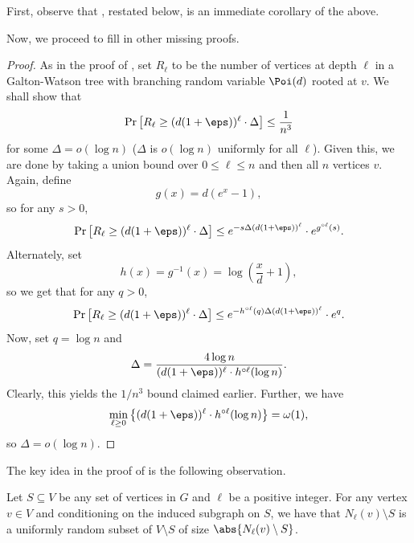 \documentclass[11pt,letterpaper]{article}
\begin{document}
First, observe that , restated below, is an immediate corollary of the above.
\radiusbound*

Now, we proceed to fill in other missing proofs.
\logloglog*

\begin{proof}
    As in the proof of , set $R_\ell$ to be the number of vertices at depth $\ell$ in a Galton-Watson tree with branching random variable $\Poi(d)$ rooted at $v$. We shall show that
    \[ \Pr\left[ R_\ell \ge (d(1+\eps))^{\ell} \cdot \Delta \right] \le \frac{1}{n^3} \]
    for some $\Delta = o(\log n)$ ($\Delta$ is $o(\log n)$ uniformly for all $\ell$). Given this, we are done by taking a union bound over $0 \le \ell \le n$ and then all $n$ vertices $v$. Again, define
    \[ g(x) = d(e^x - 1), \]
    so for any $s > 0$,
    \[ \Pr \left[ R_\ell \ge (d(1+\eps))^{\ell} \cdot \Delta \right] \le e^{-s \Delta (d(1+\eps))^{\ell}} \cdot e^{g^{\circ \ell}(s)}. \]
    Alternately, set
    \[ h(x) = g^{-1}(x) = \log \left( \frac{x}{d} + 1 \right), \]
    so we get that for any $q > 0$,
    \[ \Pr \left[ R_\ell \ge (d(1+\eps))^{\ell} \cdot \Delta \right] \le e^{-h^{\circ \ell}(q) \Delta (d(1+\eps))^{\ell}} \cdot e^{q}. \]
    Now, set $q = \log n$ and
    \[ \Delta = \frac{4 \log n}{(d(1+\eps))^{\ell} \cdot h^{\circ \ell}(\log n)}. \]
    Clearly, this yields the $1/n^3$ bound claimed earlier. Further, we have
    \[ \min_{\ell \ge 0} \left\{(d(1+\eps))^{\ell} \cdot h^{\circ \ell}(\log n)\right\} = \omega(1), \]
    so $\Delta = o(\log n)$.
\end{proof}

The key idea in the proof of  is the following observation.

\begin{observation}
    \label{obs:uniformity-nbds}
    Let $S \subseteq V$ be any set of vertices in $G$ and $\ell$ be a positive integer. For any vertex $v \in V$ and conditioning on the induced subgraph on $S$, we have that $N_{\ell}(v) \setminus S$ is a uniformly random subset of $V \setminus S$ of size $\abs{N_{\ell}(v) \setminus S}$. 
\end{observation}

\lineedgesgain*
\end{document}
